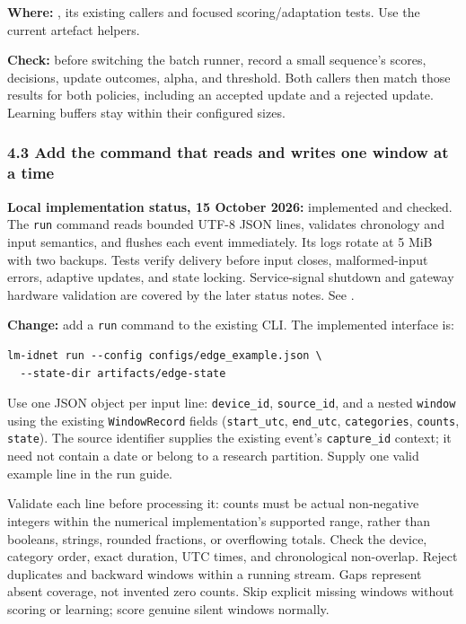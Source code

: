 \documentclass[11pt,a4paper]{article}
\begin{document}
\textbf{Where:} , its existing callers
and focused scoring/adaptation tests. Use the current artefact helpers.

\textbf{Check:} before switching the batch runner, record a small sequence's
scores, decisions, update outcomes, alpha, and threshold. Both callers then
match those results for both policies, including an accepted update and a
rejected update. Learning buffers stay within their configured sizes.

\subsubsection*{4.3 Add the command that reads and writes one window at a time}

\textbf{Local implementation status, 15 October 2026:} implemented and checked.
The \texttt{run} command reads bounded UTF-8 JSON lines, validates chronology and
input semantics, and flushes each event immediately. Its logs rotate at 5 MiB
with two backups. Tests verify delivery before input closes, malformed-input
errors, adaptive updates, and state locking. Service-signal shutdown and gateway
hardware validation are covered by the later status notes. See .

\textbf{Change:} add a \texttt{run} command to the existing CLI. The implemented
interface is:
\begin{verbatim}
lm-idnet run --config configs/edge_example.json \
  --state-dir artifacts/edge-state
\end{verbatim}
Use one JSON object per input line: \texttt{device\_id}, \texttt{source\_id}, and
a nested \texttt{window} using the existing \texttt{WindowRecord} fields
(\texttt{start\_utc}, \texttt{end\_utc}, \texttt{categories}, \texttt{counts},
\texttt{state}). The source identifier supplies the existing event's
\texttt{capture\_id} context; it need not contain a date or belong to a research
partition. Supply one valid example line in the run guide.

Validate each line before processing it: counts must be actual non-negative
integers within the numerical implementation's supported range, rather than
booleans, strings, rounded fractions, or overflowing totals. Check the device,
category order, exact duration, UTC times, and chronological non-overlap. Reject
duplicates and backward windows within a running stream. Gaps represent absent
coverage, not invented zero counts. Skip explicit missing windows without
scoring or learning; score genuine silent windows normally.
\end{document}
